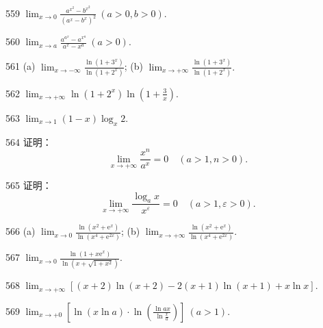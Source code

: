 \begin{prob}[S]{559}
$\displaystyle \lim_{x\to 0} \frac{a^{x^2} - b^{x^2}}{(a^x - b^x)^2} \ (a > 0, b > 0).$
\end{prob}

\begin{prob}[S]{560}
$\displaystyle \lim_{x\to a} \frac{a^{a^x} - a^{x^a}}{a^x - x^a} \ (a > 0).$
\end{prob}

\begin{prob}[M]{561}
(a) $\displaystyle \lim_{x\to -\infty} \frac{\ln(1+3^x)}{\ln(1+2^x)}$; \qquad (b) $\displaystyle \lim_{x\to +\infty} \frac{\ln(1+3^x)}{\ln(1+2^x)}.$
\end{prob}

\begin{prob}[S]{562}
$\displaystyle \lim_{x\to +\infty} \ln(1+2^x)\ln\left(1+\frac{3}{x}\right).$
\end{prob}

\begin{prob}[S]{563}
$\displaystyle \lim_{x\to 1} (1-x)\log_x 2.$
\end{prob}

\begin{prob}[M]{564}
证明：
\[
\lim_{x\to +\infty} \frac{x^n}{a^x} = 0 \quad (a > 1, n > 0).
\]
\end{prob}

\begin{prob}[M]{565}
证明：
\[
\lim_{x\to +\infty} \frac{\log_a x}{x^\varepsilon} = 0 \quad (a > 1, \varepsilon > 0).
\]
\end{prob}


\begin{prob}[M]{566}
(a) $\displaystyle \lim_{x\to 0} \frac{\ln(x^2+\mathrm{e}^x)}{\ln(x^4+\mathrm{e}^{2x})}$; \qquad (b) $\displaystyle \lim_{x\to +\infty} \frac{\ln(x^2+\mathrm{e}^x)}{\ln(x^4+\mathrm{e}^{2x})}.$
\end{prob}

\begin{prob}[S]{567}
$\displaystyle \lim_{x\to 0} \frac{\ln(1+x\mathrm{e}^x)}{\ln(x+\sqrt{1+x^2})}.$
\end{prob}

\begin{prob}[S]{568}
$\displaystyle \lim_{x\to +\infty} [(x+2)\ln(x+2) - 2(x+1)\ln(x+1) + x\ln x].$
\end{prob}

\begin{prob}[S]{569}
$\displaystyle \lim_{x\to +0} \left[\ln(x\ln a)\cdot \ln\left(\frac{\ln ax}{\ln\frac{x}{a}}\right)\right] \ (a > 1).$
\end{prob}

